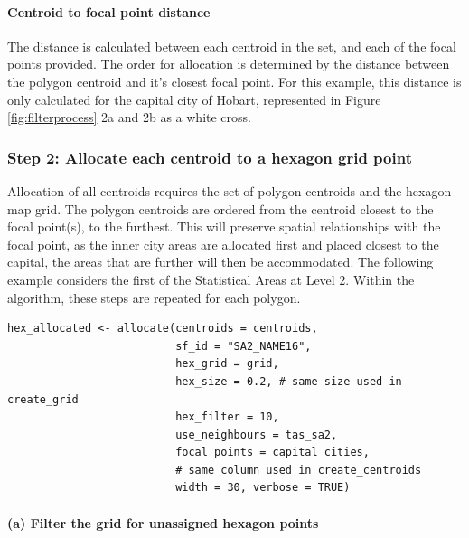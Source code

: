 \hypertarget{centroid-to-focal-point-distance}{%
\paragraph{Centroid to focal point
distance}\label{centroid-to-focal-point-distance}}

The distance is calculated between each centroid in the set, and each of
the focal points provided. The order for allocation is determined by the
distance between the polygon centroid and it's closest focal point. For
this example, this distance is only calculated for the capital city of
Hobart, represented in Figure \ref{fig:filterprocess} 2a and 2b as a
white cross.

\hypertarget{step-2-allocate-each-centroid-to-a-hexagon-grid-point}{%
\subsubsection{Step 2: Allocate each centroid to a hexagon grid
point}\label{step-2-allocate-each-centroid-to-a-hexagon-grid-point}}

Allocation of all centroids requires the set of polygon centroids and
the hexagon map grid. The polygon centroids are ordered from the
centroid closest to the focal point(s), to the furthest. This will
preserve spatial relationships with the focal point, as the inner city
areas are allocated first and placed closest to the capital, the areas
that are further will then be accommodated. The following example
considers the first of the Statistical Areas at Level 2. Within the
algorithm, these steps are repeated for each polygon.

\begin{verbatim}
hex_allocated <- allocate(centroids = centroids,
                          sf_id = "SA2_NAME16",
                          hex_grid = grid,
                          hex_size = 0.2, # same size used in create_grid
                          hex_filter = 10,
                          use_neighbours = tas_sa2,
                          focal_points = capital_cities,
                          # same column used in create_centroids
                          width = 30, verbose = TRUE)
\end{verbatim}

\hypertarget{a-filter-the-grid-for-unassigned-hexagon-points}{%
\paragraph{(a) Filter the grid for unassigned hexagon
points}\label{a-filter-the-grid-for-unassigned-hexagon-points}}

